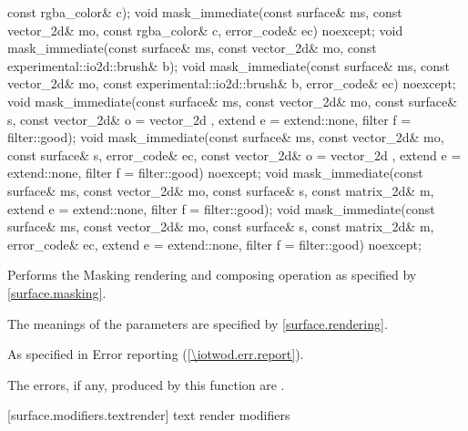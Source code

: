 \begin{itemdecl}
  const rgba_color& c);
void mask_immediate(const surface& ms, const vector_2d& mo,
  const rgba_color& c, error_code& ec) noexcept;
void mask_immediate(const surface& ms, const vector_2d& mo,
  const experimental::io2d::brush& b);
void mask_immediate(const surface& ms, const vector_2d& mo,
  const experimental::io2d::brush& b, error_code& ec) noexcept;
void mask_immediate(const surface& ms, const vector_2d& mo,
  const surface& s, const vector_2d& o = vector_2d{ },
  extend e = extend::none, filter f = filter::good);
void mask_immediate(const surface& ms, const vector_2d& mo,
  const surface& s, error_code& ec, const vector_2d& o = vector_2d{ },
  extend e = extend::none, filter f = filter::good) noexcept;
void mask_immediate(const surface& ms, const vector_2d& mo,
  const surface& s, const matrix_2d& m, extend e = extend::none,
  filter f = filter::good);
void mask_immediate(const surface& ms, const vector_2d& mo,
  const surface& s, const matrix_2d& m, error_code& ec,
  extend e = extend::none, filter f = filter::good) noexcept;
\end{itemdecl}
\begin{itemdescr}
\pnum
\effects
Performs the Masking rendering and composing operation as specified by \ref{surface.masking}.

\pnum
The meanings of the parameters are specified by \ref{surface.rendering}.

\pnum
\throws
As specified in Error reporting (\ref{\iotwod.err.report}).

\pnum
\errors
The errors, if any, produced by this function are .
\end{itemdescr}

 [surface.modifiers.textrender] { text render modifiers}

